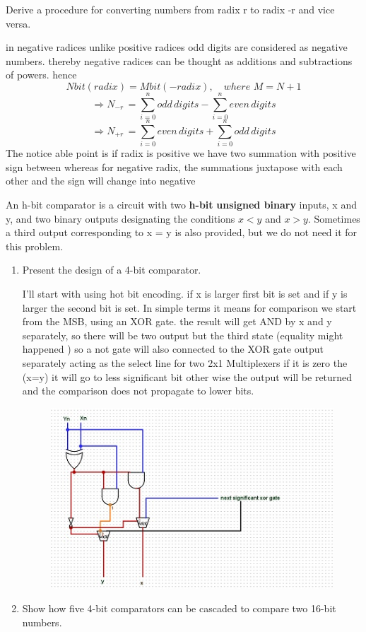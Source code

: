 \documentclass[16pt,answers]{exam}
\begin{document}
\begin{questions}
\question Derive a procedure for converting numbers from radix r to radix -r and vice
versa.
\begin{solution}
	in negative radices unlike positive radices odd digits are considered as negative numbers. thereby negative radices can be thought as  additions and subtractions of powers. hence\[
		Nbit(radix)=Mbit(-radix),\quad where\,\, M = N+1
	\]
	\[
		\Rightarrow N_{-r}\,=   \sum_{i=0}^{n}{odd\,digits} - \sum_{i=0}^{n}{even\,digits}
	\]
	\[
		\Rightarrow  N_{+r}\,= \sum_{i=0}^{n}{even\,digits} +  \sum_{i=0}^{n}{odd\,digits}
	\]
	The notice able point is if radix is positive we have two summation with positive sign between whereas for negative radix, the summations juxtapose with each other and the sign will change into negative
\end{solution}
\question An h-bit comparator is a circuit with two \textbf{h-bit} \textbf{unsigned binary} inputs, x and y,
and two binary outputs designating the conditions \(x < y\) and \(x > y\). Sometimes a
third output corresponding to x = y is also provided, but we do not need it for this
problem.
\begin{enumerate}
	\item Present the design of a 4-bit comparator.
	\begin{solution}
		I'll start with using hot bit encoding. if x is larger first bit is set and if y is larger the second bit is set. In simple terms it means for comparison we start from the MSB, using an XOR gate. the result will get AND by x and y separately, so there will be two output but the third state (equality might happened ) so a not gate will also connected to the XOR gate output separately acting as the select line for two 2x1 Multiplexers if it is zero the (x=y) it will go to less significant bit other wise the output will be returned and the comparison does not propagate to lower bits.\\
		\begin{figure}[H]
			\includegraphics{4bc.jpg}
		\end{figure}
	\end{solution}
	\item Show how five 4-bit comparators can be cascaded to compare two 16-bit
	numbers.	
\end{enumerate}


\end{questions}
\end{document}
